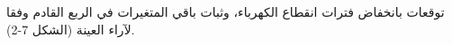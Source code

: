 توقعات بانخفاض فترات انقطاع الكهرباء، وثبات باقي المتغيرات في الربع القادم وفقا لآراء العينة (الشكل 7-2).
